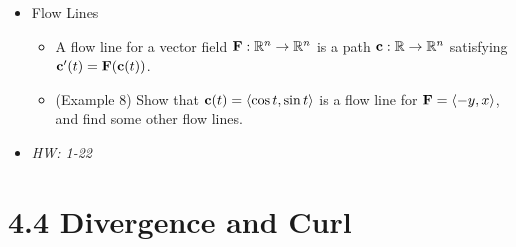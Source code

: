 \documentclass[11pt]{article}
\begin{document}
\begin{itemize}
\begin{itemize}
    \end{itemize}
  \item Flow Lines
    \begin{itemize}
      \item A flow line for a vector field \(\mathbf{F}:\mathbb R^n\to\mathbb R^n\)
        is a path \(\mathbf{c}:\mathbb R\to\mathbb R^n\) satisfying
        \(\mathbf{c}'(t)=\mathbf{F}(\mathbf{c}(t))\).
      \item (Example 8) Show that \(\mathbf{c}(t)=\langle\cos t,\sin t\rangle\) is a flow
        line for \(\mathbf{F}=\langle-y,x\rangle\), and find some other flow lines.
    \end{itemize}
  \item\textit{
    HW: 1-22
  }
\end{itemize}

\section*{4.4 Divergence and Curl}
\end{document}
